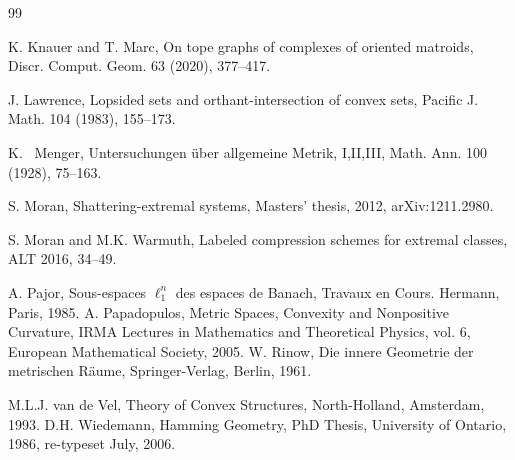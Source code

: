 \documentclass[11pt,a4paper]{amsart}
\theoremstyle{definition}
\numberwithin{equation}{section}
\begin{document}
\begin{thebibliography}{99}

 K. Knauer and T. Marc, On tope graphs of complexes of oriented matroids, Discr. Comput. Geom. 63 (2020),
377--417.

 J. Lawrence, Lopsided sets and orthant-intersection of convex sets, Pacific J. Math. 104 (1983), 155--173.

 K. ~Menger, Untersuchungen \"uber allgemeine Metrik, I,II,III, Math. Ann. 100 (1928), 75--163.

 S. Moran, Shattering-extremal systems, Masters' thesis, 2012, arXiv:1211.2980.

 S. Moran and M.K. Warmuth, Labeled compression schemes for extremal classes, ALT 2016, 34--49.

 A. Pajor, Sous-espaces $\ell^n_1$ des espaces de Banach, Travaux en Cours. Hermann,
Paris, 1985.
 A. Papadopulos, Metric Spaces, Convexity and Nonpositive Curvature, IRMA Lectures in Mathematics
and Theoretical Physics, vol. 6, European Mathematical Society, 2005.
 W. Rinow, Die innere Geometrie der metrischen R\"aume, Springer-Verlag, Berlin,  1961.

 M.L.J. van de Vel, Theory of Convex Structures,
    North-Holland, Amsterdam, 1993.
 D.H. Wiedemann, Hamming Geometry, PhD Thesis, University of Ontario, 1986, re-typeset July, 2006.

\end{thebibliography}
\end{document}

